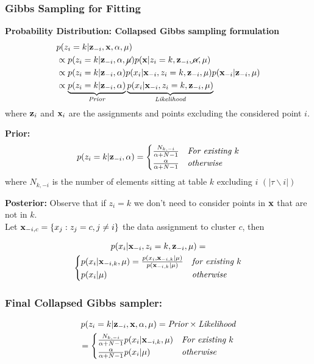 \subsubsection{Gibbs Sampling for Fitting}
\begin{minipage}{\columnwidth}
\textbf{Probability Distribution: Collapsed Gibbs sampling formulation}
\begin{align*}
	&p(z_i=k|\mathbf z_{-i},\mathbf x,\alpha,\mu) \\	
		&\propto p(z_i=k|\mathbf z_{-i},\alpha,\cancel{\mu})p(\mathbf x|z_i=k,\mathbf z_{-i},\cancel\alpha,\mu) \\
		&\propto p(z_i=k|\mathbf z_{-i},\alpha)p(x_i|\mathbf x_{-i},z_i=k, \mathbf z_{-i},\mu)p(\mathbf x_{-i}|\mathbf z_{-i}, \mu) \\
		&\propto 	\underbrace{p(z_i=k|\mathbf z_{-i},\alpha)}_{\textit{Prior}}
					\underbrace{p(x_i|\mathbf x_{-i},z_i=k, \mathbf z_{-i},\mu)}_{\textit{Likelihood}}
\end{align*}
where $\mathbf z_{i}$ and  $\mathbf x_{i}$ are the assignments and points excluding the considered point $i$.
\end{minipage}

\textbf{Prior: }
$$
	p(z_i=k|\mathbf z_{-i},\alpha) = 
		\begin{cases}
			\frac{N_{k, -i}}{\alpha + N - 1} 	& \textit{For existing $k$} \\
			\frac{\alpha}{\alpha + N - 1} 		& \textit{otherwise} 
		\end{cases}
$$
where $N_{k, -i}$ is the number of elements sitting at table $k$ excluding $i$ $(|\tau\backslash i|)$

\textbf{Posterior: } Observe that if $z_i = k$ we don't need to consider points in $\mathbf x$ that are not in $k$. \\
Let $\mathbf x_{-i, c} = \{x_j:z_j=c, j\neq i\}$ the data assignment to cluster $c$, then

\begin{multline*}
	p(x_i|\mathbf x_{-i},z_i=k, \mathbf z_{-i},\mu) = \\
		\begin{cases}
			p(x_i| \mathbf x_{-i, k}, \mu) = \frac{p(x_i, \mathbf x_{-i, k}|\mu)}{p(\mathbf x_{-i, k}|\mu)} & \textit{for existing $k$} \\
			p(x_i|\mu) & \textit{otherwise}
		\end{cases}
\end{multline*}

\subsubsection{Final Collapsed Gibbs sampler: }
\begin{multline*}
	p(z_i=k|\mathbf z_{-i},\mathbf x,\alpha,\mu) = \textit{Prior} \times \textit{Likelihood} \\
	= \begin{cases}
			\frac{N_{k, -i}}{\alpha + N - 1} p(x_i| \mathbf x_{-i, k}, \mu)	& \textit{For existing $k$} \\
			\frac{\alpha}{\alpha + N - 1} p(x_i|\mu)		& \textit{otherwise} 
		\end{cases}
\end{multline*}
	
